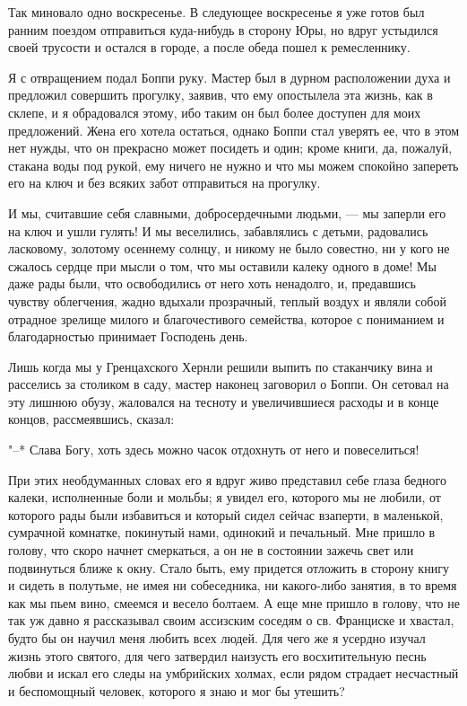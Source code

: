 Так миновало одно воскресенье. В следующее воскресенье я уже готов был
ранним  поездом  отправиться  куда-нибудь  в  сторону  Юры,  но  вдруг
устыдился своей  трусости и остался  в городе,  а после обеда  пошел к
ремесленнику.

Я с  отвращением подал  Боппи руку. Мастер  был в  дурном расположении
духа и  предложил совершить прогулку,  заявив, что ему  опостылела эта
жизнь, как  в склепе, и  я обрадовался этому,  ибо таким он  был более
доступен для моих предложений. Жена  его хотела остаться, однако Боппи
стал уверять ее, что в этом нет нужды, что он прекрасно может посидеть
и один; кроме  книги, да, пожалуй, стакана воды под  рукой, ему ничего
не нужно  и что мы  можем спокойно запереть его  на ключ и  без всяких
забот отправиться на прогулку.

И мы, считавшие себя славными,  добросердечными людьми, --- мы заперли
его на  ключ и  ушли гулять!  И мы  веселились, забавлялись  с детьми,
радовались  ласковому,  золотому осеннему  солнцу,  и  никому не  было
совестно, ни у кого не сжалось сердце при мысли о том, что мы оставили
калеку одного в доме! Мы даже рады были, что освободились от него хоть
ненадолго, и, предавшись чувству облегчения, жадно вдыхали прозрачный,
теплый воздух и являли собой  отрадное зрелище милого и благочестивого
семейства, которое  с пониманием и благодарностью  принимает Господень
день.

Лишь когда мы у Гренцахского Хернли решили выпить по стаканчику вина и
расселись за  столиком в  саду, мастер наконец  заговорил о  Боппи. Он
сетовал  на эту  лишнюю обузу,  жаловался на  тесноту и  увеличившиеся
расходы и в конце концов, рассмеявшись, сказал:

"--*  Слава  Богу,  хоть  здесь   можно  часок  отдохнуть  от  него  и
повеселиться!

При этих  необдуманных словах его  я вдруг живо представил  себе глаза
бедного калеки, исполненные  боли и мольбы; я увидел  его, которого мы
не любили,  от которого  рады были избавиться  и который  сидел сейчас
взаперти, в маленькой, сумрачной  комнатке, покинутый нами, одинокий и
печальный. Мне пришло в голову, что скоро начнет смеркаться, а он не в
состоянии зажечь  свет или подвинуться  ближе к окну. Стало  быть, ему
придется отложить  в сторону  книгу и  сидеть в  полутьме, не  имея ни
собеседника,  ни какого-либо  занятия, в  то время  как мы  пьем вино,
смеемся и  весело болтаем. А  еще мне пришло в  голову, что не  так уж
давно  я  рассказывал  своим  ассизским  соседям  о  св.  Франциске  и
хвастал, будто  бы он  научил меня  любить всех людей.  Для чего  же я
усердно изучал  жизнь этого святого,  для чего затвердил  наизусть его
восхитительную песнь  любви и  искал его  следы на  умбрийских холмах,
если рядом страдает несчастный и  беспомощный человек, которого я знаю
и мог бы утешить?

